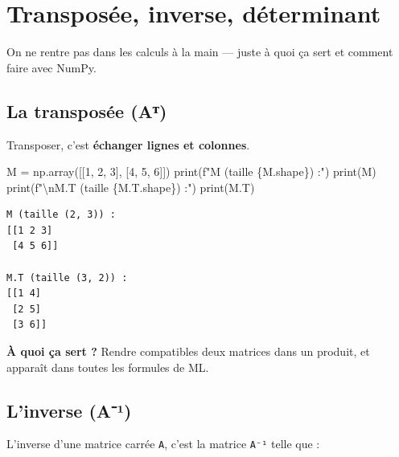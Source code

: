 \documentclass[
  french,
  11pt,
  a4paper,
]{scrbook}
\newenvironment{Shaded}{}{}
\newcommand{\BuiltInTok}[1]{\textcolor[rgb]{0.84,0.23,0.29}{#1}}
\newcommand{\CharTok}[1]{\textcolor[rgb]{0.01,0.18,0.38}{#1}}
\newcommand{\DecValTok}[1]{\textcolor[rgb]{0.00,0.36,0.77}{#1}}
\newcommand{\NormalTok}[1]{\textcolor[rgb]{0.14,0.16,0.18}{#1}}
\newcommand{\OperatorTok}[1]{\textcolor[rgb]{0.14,0.16,0.18}{#1}}
\newcommand{\SpecialCharTok}[1]{\textcolor[rgb]{0.00,0.36,0.77}{#1}}
\newcommand{\SpecialStringTok}[1]{\textcolor[rgb]{0.01,0.18,0.38}{#1}}
\begin{document}
\chapter{Transposée, inverse,
déterminant}\label{transposuxe9e-inverse-duxe9terminant}

On ne rentre pas dans les calculs à la main --- juste à quoi ça sert et
comment faire avec NumPy.

\section{La transposée (Aᵀ)}\label{la-transposuxe9e-aux1d40}

Transposer, c'est \textbf{échanger lignes et colonnes}.

\begin{Shaded}
\begin{Highlighting}[]
\NormalTok{M }\OperatorTok{=}\NormalTok{ np.array([[}\DecValTok{1}\NormalTok{, }\DecValTok{2}\NormalTok{, }\DecValTok{3}\NormalTok{], [}\DecValTok{4}\NormalTok{, }\DecValTok{5}\NormalTok{, }\DecValTok{6}\NormalTok{]])}
\BuiltInTok{print}\NormalTok{(}\SpecialStringTok{f"M (taille }\SpecialCharTok{\{}\NormalTok{M}\SpecialCharTok{.}\NormalTok{shape}\SpecialCharTok{\}}\SpecialStringTok{) :"}\NormalTok{)}
\BuiltInTok{print}\NormalTok{(M)}
\BuiltInTok{print}\NormalTok{(}\SpecialStringTok{f"}\CharTok{\textbackslash{}n}\SpecialStringTok{M.T (taille }\SpecialCharTok{\{}\NormalTok{M}\SpecialCharTok{.}\NormalTok{T}\SpecialCharTok{.}\NormalTok{shape}\SpecialCharTok{\}}\SpecialStringTok{) :"}\NormalTok{)}
\BuiltInTok{print}\NormalTok{(M.T)}
\end{Highlighting}
\end{Shaded}

\begin{verbatim}
M (taille (2, 3)) :
[[1 2 3]
 [4 5 6]]

M.T (taille (3, 2)) :
[[1 4]
 [2 5]
 [3 6]]
\end{verbatim}

\textbf{À quoi ça sert ?} Rendre compatibles deux matrices dans un
produit, et apparaît dans toutes les formules de ML.

\section{L'inverse (A⁻¹)}\label{linverse-auxb9}

L'inverse d'une matrice carrée \texttt{A}, c'est la matrice \texttt{A⁻¹}
telle que :
\end{document}
